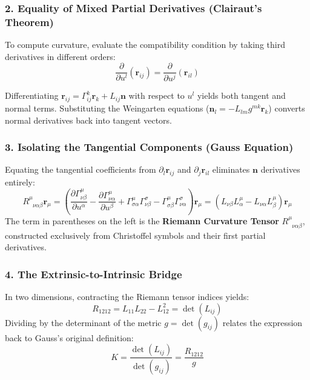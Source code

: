 \documentclass[11pt,a4paper]{article}
\begin{document}
	\subsubsection{2. Equality of Mixed Partial Derivatives (Clairaut's Theorem)}
	To compute curvature, evaluate the compatibility condition by taking third derivatives in different orders:
	\begin{equation}
		\frac{\partial}{\partial u^l}(\mathbf{r}_{ij}) = \frac{\partial}{\partial u^j}(\mathbf{r}_{il})
	\end{equation}
	
	Differentiating $\mathbf{r}_{ij} = \Gamma_{ij}^k \mathbf{r}_k + L_{ij} \mathbf{n}$ with respect to $u^l$ yields both tangent and normal terms. Substituting the Weingarten equations ($\mathbf{n}_l = -L_{lm} g^{mk} \mathbf{r}_k$) converts normal derivatives back into tangent vectors.
	
	\subsubsection{3. Isolating the Tangential Components (Gauss Equation)}
	Equating the tangential coefficients from $\partial_l \mathbf{r}_{ij}$ and $\partial_j \mathbf{r}_{il}$ eliminates $\mathbf{n}$ derivatives entirely:
	\begin{equation}
		R^\mu_{\phantom{\mu}\nu \alpha \beta} \mathbf{r}_\mu = \left( \frac{\partial \Gamma_{\nu\beta}^\mu}{\partial u^\alpha} - \frac{\partial \Gamma_{\nu\alpha}^\mu}{\partial u^\beta} + \Gamma_{\sigma\alpha}^\mu \Gamma_{\nu\beta}^\sigma - \Gamma_{\sigma\beta}^\mu \Gamma_{\nu\alpha}^\sigma \right) \mathbf{r}_\mu = \left( L_{\nu\beta} L_{\alpha}^\mu - L_{\nu\alpha} L_{\beta}^\mu \right) \mathbf{r}_\mu
	\end{equation}
	The term in parentheses on the left is the \textbf{Riemann Curvature Tensor} $R^\mu_{\phantom{\mu}\nu \alpha \beta}$, constructed exclusively from Christoffel symbols and their first partial derivatives.
	
	\subsubsection{4. The Extrinsic-to-Intrinsic Bridge}
	In two dimensions, contracting the Riemann tensor indices yields:
	\begin{equation}
		R_{1212} = L_{11}L_{22} - L_{12}^2 = \det(L_{ij})
	\end{equation}
	Dividing by the determinant of the metric $g = \det(g_{ij})$ relates the expression back to Gauss's original definition:
	\begin{equation}
		K = \frac{\det(L_{ij})}{\det(g_{ij})} = \frac{R_{1212}}{g}
	\end{equation}
	
\end{document}
